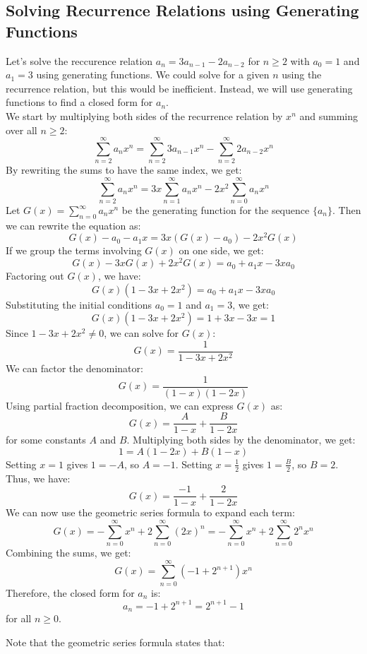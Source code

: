 \subsection{Solving Recurrence Relations using Generating Functions}
\begin{eg}
    Let's solve the reccurence relation $a_n = 3a_{n-1}- 2a_{n-2}$ for $n \geq 2$ with $a_0 = 1$ and $a_1 = 3$ using generating functions. We could solve for a given $n$ using the recurrence relation, but this would be inefficient. Instead, we will use generating functions to find a closed form for $a_n$. \\
    We start by multiplying both sides of the recurrence relation by $x^n$ and summing over all $n \geq 2$:
    \[ \sum_{n=2}^{\infty} a_n x^n = \sum_{n=2}^{\infty} 3a_{n-1} x^n - \sum_{n=2}^{\infty} 2a_{n-2} x^n \]
    By rewriting the sums to have the same index, we get:
    \[ \sum_{n=2}^{\infty} a_n x^n = 3x \sum_{n=1}^{\infty} a_n x^n - 2x^2 \sum_{n=0}^{\infty} a_n x^n \]
    Let $G(x) = \sum_{n=0}^{\infty} a_n x^n$ be the generating function for the sequence $\{a_n\}$. Then we can rewrite the equation as:
    \[ G(x) - a_0 - a_1 x = 3x (G(x) - a_0) - 2x^2 G(x) \]
    If we group the terms involving $G(x)$ on one side, we get:
    \[ G(x) - 3x G(x) + 2x^2 G(x) = a_0 + a_1 x - 3x a_0 \]
    Factoring out $G(x)$, we have:
    \[ G(x)(1 - 3x + 2x^2) = a_0 + a_1 x - 3x a_0 \]
    Substituting the initial conditions $a_0 = 1$ and $a_1 = 3$, we get:
    \[ G(x)(1 - 3x + 2x^2) = 1 + 3x - 3x = 1 \]
    Since $1 - 3x + 2x^2 \neq 0$, we can solve for $G(x)$:
    \[ G(x) = \frac{1}{1 - 3x + 2x^2} \]
    We can factor the denominator:
    \[ G(x) = \frac{1}{(1 - x)(1 - 2x)} \]
    Using partial fraction decomposition, we can express $G(x)$ as:
    \[ G(x) = \frac{A}{1 - x} + \frac{B}{1 - 2x} \]
    for some constants $A$ and $B$. Multiplying both sides by the denominator, we get:
    \[ 1 = A(1 - 2x) + B(1 - x) \]
    Setting $x = 1$ gives $1 = -A$, so $A = -1$. Setting $x = \frac{1}{2}$ gives $1 = \frac{B}{2}$, so $B = 2$. Thus, we have:
    \[ G(x) = \frac{-1}{1 - x} + \frac{2}{1 - 2x} \]
    We can now use the geometric series formula to expand each term:
    \[ G(x) = -\sum_{n=0}^{\infty} x^n + 2\sum_{n=0}^{\infty} (2x)^n = -\sum_{n=0}^{\infty} x^n + 2\sum_{n=0}^{\infty} 2^n x^n \]
    Combining the sums, we get:
    \[ G(x) = \sum_{n=0}^{\infty} (-1 + 2^{n+1}) x^n \]
    Therefore, the closed form for $a_n$ is:
    \[ a_n = -1 + 2^{n+1} = 2^{n+1} - 1 \]
    for all $n \geq 0$.
\end{eg}
Note that the geometric series formula states that:
